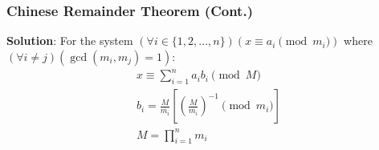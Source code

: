 \documentclass{beamer}
\begin{document}
\begin{frame}
    \frametitle{Chinese Remainder Theorem (Cont.)}
    {\bf Solution}: For the system $(\forall i\in\{1,2,...,n\})(x\equiv a_i\pmod {m_i})$ where $(\forall i\neq j)(\gcd(m_i,m_j)=1)$:
    \begin{gather*}
        x\equiv\sum_{i=1}^n a_ib_i\pmod M\\
        b_i=\frac{M}{m_i}\left[\left(\frac{M}{m_i}\right)^{-1}\pmod{m_i}\right]\\
        M=\prod_{i=1}^n m_i
    \end{gather*}
\end{frame}
\end{document}
